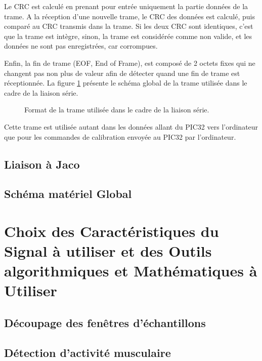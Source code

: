 \documentclass[letterpaper, twoside, 12pt, memoire, creativecommons, hyperref]{thETS}
\begin{document}
Le CRC est calculé en prenant pour entrée uniquement la partie données de la trame. A la réception d'une nouvelle trame, le CRC des données est calculé, puis comparé au CRC transmis dans la trame. Si les deux CRC sont identiques, c'est que la trame est intègre, sinon, la trame est considérée comme non valide, et les données ne sont pas enregistrées, car corrompues.

Enfin, la fin de trame (EOF, End of Frame), est composé de 2 octets fixes qui ne changent pas non plus de valeur afin de détecter quand une fin de trame est réceptionnée. La figure \ref{fig:serialframe} présente le schéma global de la trame utilisée dans le cadre de la liaison série.

\begin{figure}
	\centering
	\caption{Format de la trame utilisée dans le cadre de la liaison série.}
	\label{fig:serialframe}
\end{figure}

Cette trame est utilisée autant dans les données allant du PIC32 vers l'ordinateur que pour les commandes de calibration envoyée au PIC32 par l'ordinateur.

\subsection{Liaison à Jaco}

\subsection{Schéma matériel Global}

\section{Choix des Caractéristiques du Signal à utiliser et des Outils algorithmiques et Mathématiques à Utiliser}

\subsection{Découpage des fenêtres d'échantillons}

\subsection{Détection d'activité musculaire}
\end{document}
